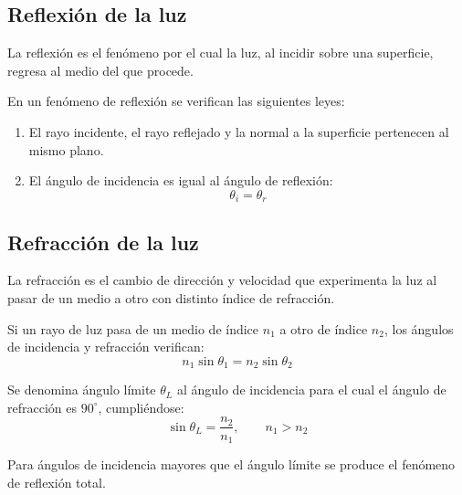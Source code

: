 \documentclass[10pt]{article}
\begin{document}
\subsection{Reflexión de la luz}

\begin{definition}[Reflexión]
  La reflexión es el fenómeno por el cual la luz, al incidir sobre una superficie, regresa al medio del que procede.
\end{definition}

\begin{theorem}
  En un fenómeno de reflexión se verifican las siguientes leyes:
  \begin{enumerate}
    \item El rayo incidente, el rayo reflejado y la normal a la superficie pertenecen al mismo plano.
    \item El ángulo de incidencia es igual al ángulo de reflexión:
      \[ \theta_i = \theta_r \]
  \end{enumerate}
\end{theorem}

\subsection{Refracción de la luz}

\begin{definition}[Refracción]
  La refracción es el cambio de dirección y velocidad que experimenta la luz al pasar de un medio a otro con distinto índice de refracción.
\end{definition}

\begin{theorem}
  Si un rayo de luz pasa de un medio de índice $n_1$ a otro de índice $n_2$, los ángulos de incidencia y refracción verifican:
  \[ n_1 \sin \theta_1 = n_2 \sin \theta_2 \]
\end{theorem}

\begin{definition}
  Se denomina ángulo límite $\theta_L$ al ángulo de incidencia para el cual el ángulo de refracción es $90^\circ$, cumpliéndose:
  \[ \sin \theta_L = \frac{n_2}{n_1}, \qquad n_1 > n_2 \]
\end{definition}

\begin{remark}
  Para ángulos de incidencia mayores que el ángulo límite se produce el fenómeno de reflexión total.
\end{remark}
\end{document}
